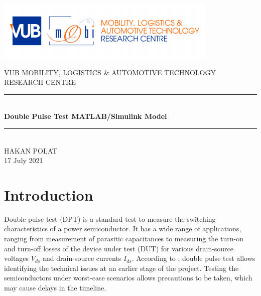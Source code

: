 \documentclass[12pt]{article} %
\begin{document}

\begin{titlepage}
	\centering
    \vspace{3cm}
    \includegraphics[scale = 1.5]{figures/MOBI_0.jpg}\\[1.0 cm]	%
    \vspace{3cm}
    
    \centering\LARGE{VUB MOBILITY, LOGISTICS \& AUTOMOTIVE TECHNOLOGY RESEARCH CENTRE}
    \vspace{3cm}
	
	\rule{\linewidth}{0.2 mm} \\[0.4 cm]
	{ \huge \bfseries Double Pulse Test MATLAB/Simulink Model}\\
	\rule{\linewidth}{0.2 mm} \\[1.5 cm]
	\vspace{3cm}
	\centering\LARGE{HAKAN POLAT}\\
	\vspace{1cm}
	\centering\large{17 July 2021}
	
	
   
    
    
    
	
\end{titlepage}






\section{Introduction}

Double pulse test (DPT) is a standard test to measure the switching characteristics of a power semiconductor. It has a wide range of applications, ranging from measurement of parasitic capacitances to measuring the turn-on and turn-off losses of the device under test (DUT) for various drain-source voltages $V_{ds}$ and drain-source currents $I_{ds}$. According to \cite{Infineon}, double pulse test allows identifying the technical issues at an earlier stage of the project. Testing the semiconductors under worst-case scenarios allows precautions to be taken, which may cause delays in the timeline.\\
\end{document}
